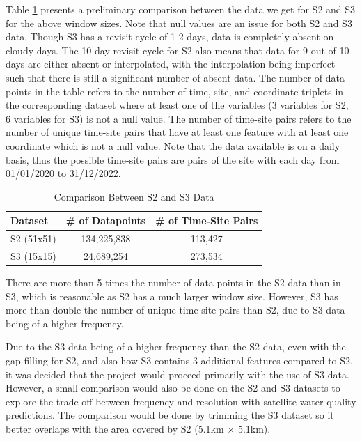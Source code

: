 \documentclass[a4paper,11pt]{report}
\begin{document}
Table \ref{tab:s2_s3_comparison} presents a preliminary comparison between the data we get for S2 and S3 for the above window sizes. Note that null values are an issue for both S2 and S3 data. Though S3 has a revisit cycle of 1-2 days, data is completely absent on cloudy days. The 10-day revisit cycle for S2 also means that data for 9 out of 10 days are either absent or interpolated, with the interpolation being imperfect such that there is still a significant number of absent data. The number of data points in the table refers to the number of time, site, and coordinate triplets in the corresponding dataset where at least one of the variables (3 variables for S2, 6 variables for S3) is not a null value. The number of time-site pairs refers to the number of unique time-site pairs that have at least one feature with at least one coordinate which is not a null value. Note that the data available is on a daily basis, thus the possible time-site pairs are pairs of the site with each day from 01/01/2020 to 31/12/2022. 

    \begin{table}[H]
        \caption{Comparison Between S2 and S3 Data}
        \label{tab:s2_s3_comparison}
        \centering
        \begin{tabular}{lcc}
        \toprule
        \textbf{Dataset} & \textbf{\# of Datapoints} & \textbf{\# of Time-Site Pairs} \\
        \midrule
        S2 (51x51) & 134,225,838 & 113,427 \\
        S3 (15x15) &  24,689,254 & 273,534  \\ \bottomrule
        \end{tabular}
    \end{table}

There are more than 5 times the number of data points in the S2 data than in S3, which is reasonable as S2 has a much larger window size. However, S3 has more than double the number of unique time-site pairs than S2, due to S3 data being of a higher frequency. 

Due to the S3 data being of a higher frequency than the S2 data, even with the gap-filling for S2, and also how S3 contains 3 additional features compared to S2, it was decided that the project would proceed primarily with the use of S3 data. However, a small comparison would also be done on the S2 and S3 datasets to explore the trade-off between frequency and resolution with satellite water quality predictions. The comparison would be done by trimming the S3 dataset so it better overlaps with the area covered by S2 (5.1km $\times$ 5.1km).
\end{document}
